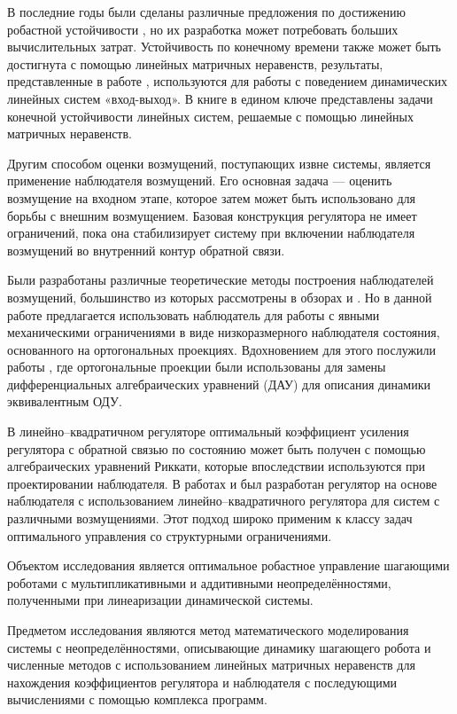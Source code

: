 В последние годы были сделаны различные предложения по достижению робастной устойчивости \cite{LMI7, LMI8}, но их разработка может потребовать больших вычислительных затрат.
Устойчивость по конечному времени также может быть достигнута с помощью линейных матричных неравенств, результаты, представленные в работе \cite{LMI6}, используются для работы с поведением динамических линейных систем «вход-выход». В книге \cite{Amato2011} в едином ключе представлены задачи конечной устойчивости линейных систем, решаемые с помощью линейных матричных неравенств.

Другим способом оценки возмущений, поступающих извне системы, является применение наблюдателя возмущений. Его основная задача --- оценить возмущение на входном этапе, которое затем может быть использовано для борьбы с внешним возмущением. Базовая конструкция регулятора не имеет ограничений, пока она стабилизирует систему при включении наблюдателя возмущений во внутренний контур обратной связи.

Были разработаны различные теоретические методы построения наблюдателей возмущений, большинство из которых рассмотрены в обзорах \cite{ObserverITMO} и \cite{Disturb_obs}. Но в данной работе предлагается использовать наблюдатель для работы с явными механическими ограничениями в виде низкоразмерного наблюдателя состояния, основанного на ортогональных проекциях. Вдохновением для этого послужили работы \cite{SAVIN2021, Righetti2011}, где ортогональные проекции были использованы для замены дифференциальных алгебраических уравнений (ДАУ) для описания динамики эквивалентным ОДУ. 

В линейно--квадратичном регуляторе оптимальный коэффициент усиления регулятора с обратной связью по состоянию может быть получен с помощью алгебраических уравнений Риккати, которые впоследствии используются при проектировании наблюдателя. В работах \cite{LQR1} и \cite{LQR2} был разработан регулятор на основе наблюдателя с использованием линейно--квадратичного регулятора для систем с различными возмущениями. Этот подход широко применим к классу задач оптимального управления со структурными ограничениями. 

{\objectsubject} 

Объектом исследования является оптимальное робастное управление шагающими роботами с мультипликативными и аддитивными неопределённостями, полученными при линеаризации динамической системы.

Предметом исследования являются метод математического моделирования системы с неопределённостями, описывающие динамику шагающего робота и численные методов с использованием линейных матричных неравенств для нахождения коэффициентов регулятора и наблюдателя с последующими вычислениями с помощью комплекса программ.

